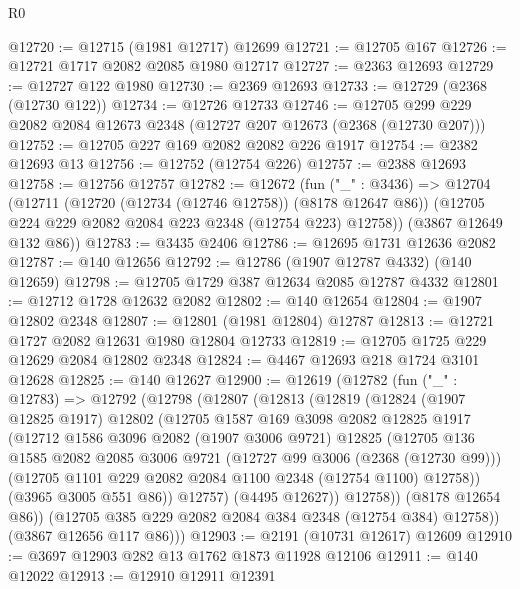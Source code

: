 \begin{lexlean}{R0}
\begin{coremodule}
@12720 := @12715 (@1981 @12717) @12699
@12721 := @12705 @167
@12726 := @12721 @1717 @2082 @2085 @1980 @12717
@12727 := @2363 @12693
@12729 := @12727 @122 @1980
@12730 := @2369 @12693
@12733 := @12729 (@2368 (@12730 @122))
@12734 := @12726 @12733
@12746 := @12705 @299 @229 @2082 @2084 @12673 @2348 (@12727 @207 @12673 (@2368 (@12730 @207)))
@12752 := @12705 @227 @169 @2082 @2082 @226 @1917
@12754 := @2382 @12693 @13
@12756 := @12752 (@12754 @226)
@12757 := @2388 @12693
@12758 := @12756 @12757
@12782 := @12672
    (fun ("_" : @3436) =>
    @12704
      (@12711
        (@12720 (@12734 (@12746 @12758)) (@8178 @12647 @86))
        (@12705 @224 @229 @2082 @2084 @223 @2348 (@12754 @223) @12758))
      (@3867 @12649 @132 @86))
@12783 := @3435 @2406
@12786 := @12695 @1731 @12636 @2082
@12787 := @140 @12656
@12792 := @12786 (@1907 @12787 @4332) (@140 @12659)
@12798 := @12705 @1729 @387 @12634 @2085 @12787 @4332
@12801 := @12712 @1728 @12632 @2082
@12802 := @140 @12654
@12804 := @1907 @12802 @2348
@12807 := @12801 (@1981 @12804) @12787
@12813 := @12721 @1727 @2082 @12631 @1980 @12804 @12733
@12819 := @12705 @1725 @229 @12629 @2084 @12802 @2348
@12824 := @4467 @12693 @218 @1724 @3101 @12628
@12825 := @140 @12627
@12900 := @12619
    (@12782
      (fun ("_" : @12783) =>
      @12792
        (@12798
          (@12807
            (@12813
              (@12819
                (@12824
                  (@1907 @12825 @1917)
                  @12802
                  (@12705
                    @1587
                    @169
                    @3098
                    @2082
                    @12825
                    @1917
                    (@12712
                      @1586
                      @3096
                      @2082
                      (@1907 @3006 @9721)
                      @12825
                      (@12705
                        @136
                        @1585
                        @2082
                        @2085
                        @3006
                        @9721
                        (@12727 @99 @3006 (@2368 (@12730 @99)))
                        (@12705 @1101 @229 @2082 @2084 @1100 @2348 (@12754 @1100) @12758))
                      (@3965 @3005 @551 @86))
                    @12757)
                  (@4495 @12627))
                @12758))
            (@8178 @12654 @86))
          (@12705 @385 @229 @2082 @2084 @384 @2348 (@12754 @384) @12758))
        (@3867 @12656 @117 @86)))
@12903 := @2191 (@10731 @12617) @12609
@12910 := @3697 @12903 @282 @13 @1762 @1873 @11928 @12106
@12911 := @140 @12022
@12913 := @12910 @12911 @12391

\end{coremodule}
\end{lexlean}
